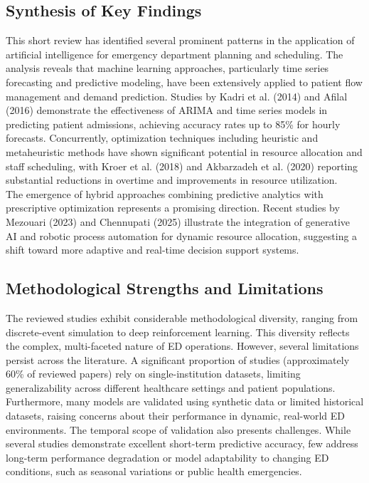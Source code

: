 \documentclass[runningheads]{llncs}
\begin{document}
\subsection{Synthesis of Key Findings}
This short review has identified several prominent patterns in the application of artificial intelligence for emergency department planning and scheduling. The analysis reveals that machine learning approaches, particularly time series forecasting and predictive modeling, have been extensively applied to patient flow management and demand prediction. Studies by \cite{kadri2014ed} Kadri et al. (2014) and \cite{afilal2016edflow} Afilal (2016) demonstrate the effectiveness of ARIMA and time series models in predicting patient admissions, achieving accuracy rates up to 85\% for hourly forecasts. Concurrently, optimization techniques including heuristic and metaheuristic methods have shown significant potential in resource allocation and staff scheduling, with \cite{kroer2018or} Kroer et al. (2018) and \cite{akbarzadeh2020or} Akbarzadeh et al. (2020) reporting substantial reductions in overtime and improvements in resource utilization.\\
The emergence of hybrid approaches combining predictive analytics with prescriptive optimization represents a promising direction. Recent studies by \cite{mezouari2023thesis} Mezouari (2023) and \cite{chennupati2025aira} Chennupati (2025) illustrate the integration of generative AI and robotic process automation for dynamic resource allocation, suggesting a shift toward more adaptive and real-time decision support systems.
\subsection{Methodological Strengths and Limitations}
The reviewed studies exhibit considerable methodological diversity, ranging from discrete-event simulation to deep reinforcement learning. This diversity reflects the complex, multi-faceted nature of ED operations. However, several limitations persist across the literature. A significant proportion of studies (approximately 60\% of reviewed papers) rely on single-institution datasets, limiting generalizability across different healthcare settings and patient populations. Furthermore, many models are validated using synthetic data or limited historical datasets, raising concerns about their performance in dynamic, real-world ED environments.
The temporal scope of validation also presents challenges. While several studies demonstrate excellent short-term predictive accuracy, few address long-term performance degradation or model adaptability to changing ED conditions, such as seasonal variations or public health emergencies.
\end{document}
